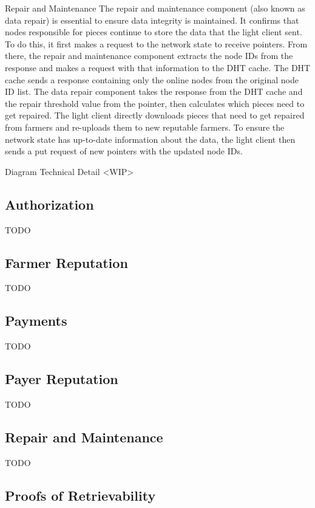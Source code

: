 \documentclass[a4paper,10pt]{article}
\newcommand{\todo}[1]{{\color{red} TODO #1}}
\begin{document}
Repair and Maintenance
The repair and maintenance component (also known as data repair) is essential to ensure
data integrity is maintained. It confirms that nodes responsible for pieces continue to
store the data that the light client sent. To do this, it first makes a request to the
network state to receive pointers. From there, the repair and maintenance component
extracts the node IDs from the response and makes a request with that information to the
DHT cache. The DHT cache sends a response containing only the online nodes from the original
node ID list. The data repair component takes the response from the DHT cache and the
repair threshold value from the pointer, then calculates which pieces need to get repaired. The
light client directly downloads pieces that need to get repaired from farmers and re-uploads
them to new reputable farmers. To ensure the network state has up-to-date information about
the data, the light client then sends a put request of new pointers with the updated node IDs.


Diagram Technical Detail
<WIP>

\subsection{Authorization}

\todo{}

\subsection{Farmer Reputation}

\todo{}

\subsection{Payments}

\todo{}

\subsection{Payer Reputation}

\todo{}

\subsection{Repair and Maintenance}

\todo{}

\subsection{Proofs of Retrievability}
\end{document}
